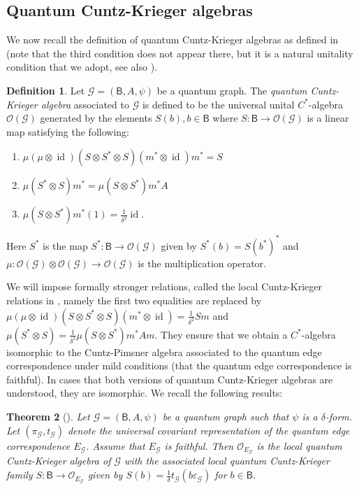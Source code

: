 \documentclass[a4paper,reqno]{amsart}
\numberwithin{equation}{section}
\newtheorem{theorem}{Theorem}
\numberwithin{theorem}{section}
\theoremstyle{definition}\newtheorem{definition}[theorem]{Definition}
\theoremstyle{definition}\newtheorem{remark}[theorem]{Remark}
\theoremstyle{definition}\newtheorem{example}[theorem]{Example}
\theoremstyle{definition}\newtheorem*{notation*}{Notation}
\theoremstyle{definition}\newtheorem*{convention*}{Convention}
\theoremstyle{definition}\newtheorem{observation}{Observation}
\theoremstyle{definition}\newtheorem*{acknowledgment*}{Acknowledgments}
\newcommand{\B}{\mathsf{B}}
\newcommand{\G}{\mathcal{G}}
\newcommand{\cst}{C^*}
\DeclareMathOperator{\id}{id}
\begin{document}
\subsection{Quantum Cuntz-Krieger algebras}
We now recall the definition of quantum Cuntz-Krieger algebras as defined in \cite{BEVW} (note that the third condition does not appear there, but it is a natural unitality condition that we adopt, see also \cite[Definition 3.1]{BHINW}).
\begin{definition}
    Let $\G=(\B, A, \psi)$ be a quantum graph. The {\em quantum Cuntz-Krieger algebra} associated to $\G$ is defined to be the universal unital $\cst$-algebra $\mathcal{O}(\G)$ generated by the elements $S(b), b\in \B$ where $S:\B\to\mathcal{O}(\G)$ is a linear map satisfying the following:
    \begin{enumerate}
        \item $\mu(\mu\otimes \id)(S\otimes S^*\otimes S)(m^*\otimes \id)m^*=S$
        \item $\mu(S^*\otimes S)m^*=\mu(S\otimes S^*)m^*A$
        \item $\mu(S\otimes S^*)m^*(1)=\frac{1}{\delta^2}\id$.
    \end{enumerate}
    Here $S^*$ is the map $S^*:\B\to\mathcal{O}(\G)$ given by $S^*(b)=S(b^*)^*$ and $\mu:\mathcal{O}(\G)\otimes\mathcal{O}(\G)\to\mathcal{O}(\G)$ is the multiplication operator.
\end{definition}


We will impose formally stronger relations, called the local Cuntz-Krieger relations in \cite[Definition 3.4]{BHINW}, namely the first two equalities are replaced by $\mu(\mu\otimes \id)(S\otimes S^*\otimes S)(m^*\otimes \id)=\frac{1}{\delta^2}Sm$ and $\mu(S^*\otimes S)=\frac{1}{\delta^2}\mu(S\otimes S^*)m^* Am$. They ensure that we obtain a $C^{\ast}$-algebra isomorphic to the Cuntz-Pimsner algebra associated to the quantum edge correspondence under mild conditions (that the quantum edge correspondence is faithful). In cases that both versions of quantum Cuntz-Krieger algebras are understood, they are isomorphic. We recall the following results:

\begin{theorem}[{\cite[Theorem 3.6]{BHINW}}]\label{thm:local CKA and CPA}
    Let $\G=(\B, A,\psi)$ be a quantum graph such that $\psi$ is a $\delta$-form. Let $(\pi_\G, t_\G)$ denote the universal covariant representation of the quantum edge correspondence $E_\G$. Assume that $E_\G$ is faithful.  Then $\mathcal{O}_{E_\G}$ is the local quantum Cuntz-Krieger algebra of $\G$ with the associated local quantum Cuntz-Krieger family  $S:\B\to \mathcal{O}_{E_\G}$ given by $S(b)=\frac{1}{\delta}t_{\G}(b\varepsilon_\G)$ for $b\in \B$.
\end{theorem}
\end{document}
